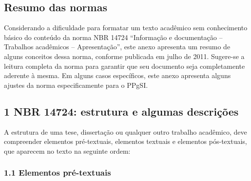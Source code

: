\documentclass[
	12pt,				%
	oneside,			%
	a4paper,			%
	english,			%
	brazil				%
	]{abntex2ppgsi}
\begin{document}

\begin{anexosenv}



%
%
%
\chapter{Resumo das normas}
\label{anexoA}

Considerando a dificuldade para formatar um texto acadêmico sem conhecimento básico do conteúdo da norma NBR 14724 ``Informação e documentação – Trabalhos acadêmicos – Apresentação'', este anexo apresenta um resumo de alguns conceitos dessa norma, conforme publicada em julho de 2011. Sugere-se a leitura completa da norma para garantir que seu documento seja completamente aderente à mesma. Em alguns casos específicos, este anexo apresenta alguns ajustes da norma especificamente para o PPgSI.

\section*{1 NBR 14724: estrutura e algumas descrições}

A estrutura de uma tese, dissertação ou qualquer outro trabalho acadêmico, deve compreender elementos pré-textuais, elementos textuais e elementos pós-textuais, que aparecem no texto na seguinte ordem:

\subsection*{1.1 Elementos pré-textuais}


\end{anexosenv}
\end{document}

